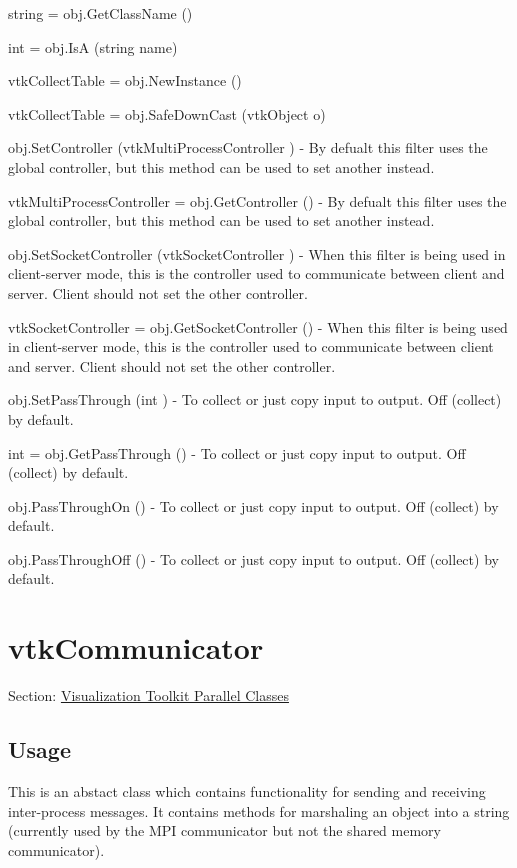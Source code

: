 \begin{DoxyItemize}
\item {\ttfamily string = obj.\-Get\-Class\-Name ()}  
\item {\ttfamily int = obj.\-Is\-A (string name)}  
\item {\ttfamily vtk\-Collect\-Table = obj.\-New\-Instance ()}  
\item {\ttfamily vtk\-Collect\-Table = obj.\-Safe\-Down\-Cast (vtk\-Object o)}  
\item {\ttfamily obj.\-Set\-Controller (vtk\-Multi\-Process\-Controller )} -\/ By defualt this filter uses the global controller, but this method can be used to set another instead.  
\item {\ttfamily vtk\-Multi\-Process\-Controller = obj.\-Get\-Controller ()} -\/ By defualt this filter uses the global controller, but this method can be used to set another instead.  
\item {\ttfamily obj.\-Set\-Socket\-Controller (vtk\-Socket\-Controller )} -\/ When this filter is being used in client-\/server mode, this is the controller used to communicate between client and server. Client should not set the other controller.  
\item {\ttfamily vtk\-Socket\-Controller = obj.\-Get\-Socket\-Controller ()} -\/ When this filter is being used in client-\/server mode, this is the controller used to communicate between client and server. Client should not set the other controller.  
\item {\ttfamily obj.\-Set\-Pass\-Through (int )} -\/ To collect or just copy input to output. Off (collect) by default.  
\item {\ttfamily int = obj.\-Get\-Pass\-Through ()} -\/ To collect or just copy input to output. Off (collect) by default.  
\item {\ttfamily obj.\-Pass\-Through\-On ()} -\/ To collect or just copy input to output. Off (collect) by default.  
\item {\ttfamily obj.\-Pass\-Through\-Off ()} -\/ To collect or just copy input to output. Off (collect) by default.  
\end{DoxyItemize}\hypertarget{vtkparallel_vtkcommunicator}{}\section{vtk\-Communicator}\label{vtkparallel_vtkcommunicator}
Section\-: \hyperlink{sec_vtkparallel}{Visualization Toolkit Parallel Classes} \hypertarget{vtkwidgets_vtkxyplotwidget_Usage}{}\subsection{Usage}\label{vtkwidgets_vtkxyplotwidget_Usage}
This is an abstact class which contains functionality for sending and receiving inter-\/process messages. It contains methods for marshaling an object into a string (currently used by the M\-P\-I communicator but not the shared memory communicator).

